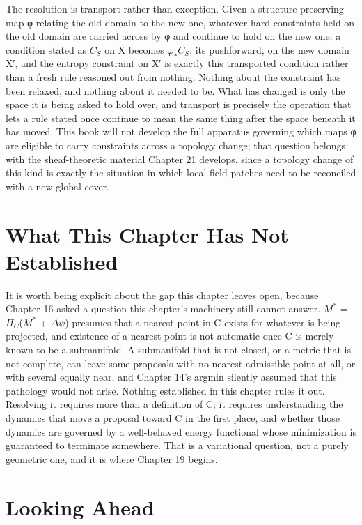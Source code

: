 The resolution is transport rather than exception. Given a structure-preserving map φ relating the old domain to the new one, whatever hard constraints held on the old domain are carried across by φ and continue to hold on the new one: a condition stated as \(C_S\) on X becomes \(\varphi_*C_S\), its pushforward, on the new domain X′, and the entropy constraint on X′ is exactly this transported condition rather than a fresh rule reasoned out from nothing. Nothing about the constraint has been relaxed, and nothing about it needed to be. What has changed is only the space it is being asked to hold over, and transport is precisely the operation that lets a rule stated once continue to mean the same thing after the space beneath it has moved. This book will not develop the full apparatus governing which maps φ are eligible to carry constraints across a topology change; that question belongs with the sheaf-theoretic material Chapter 21 develops, since a topology change of this kind is exactly the situation in which local field-patches need to be reconciled with a new global cover.

\section{What This Chapter Has Not Established}

It is worth being explicit about the gap this chapter leaves open, because Chapter 16 asked a question this chapter's machinery still cannot answer. \(M^*\) = \(\Pi_C\)(\(M^*\) + \(\Delta\psi\)) presumes that a nearest point in C exists for whatever is being projected, and existence of a nearest point is not automatic once C is merely known to be a submanifold. A submanifold that is not closed, or a metric that is not complete, can leave some proposals with no nearest admissible point at all, or with several equally near, and Chapter 14's argmin silently assumed that this pathology would not arise. Nothing established in this chapter rules it out. Resolving it requires more than a definition of C; it requires understanding the dynamics that move a proposal toward C in the first place, and whether those dynamics are governed by a well-behaved energy functional whose minimization is guaranteed to terminate somewhere. That is a variational question, not a purely geometric one, and it is where Chapter 19 begins.

\section{Looking Ahead}

